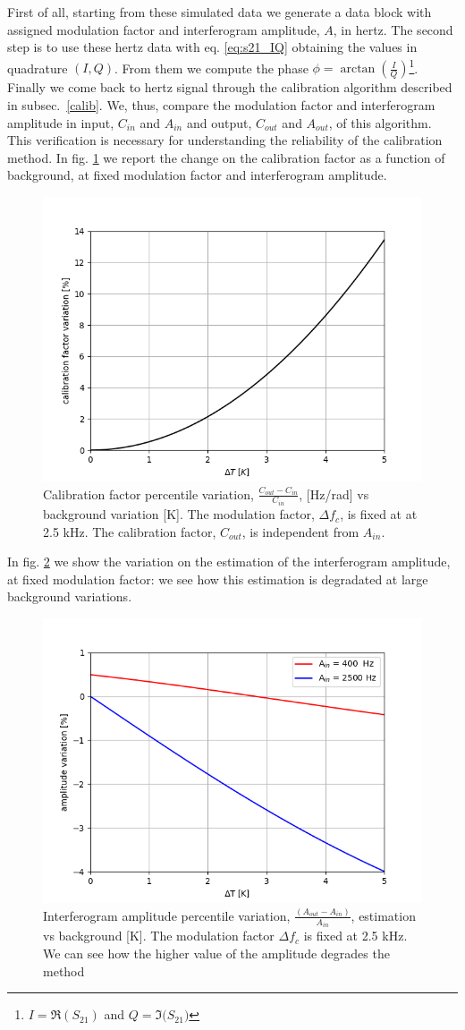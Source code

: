 \documentclass[twocolumn,traditabstract]{aa}\\
\begin{document}
First of all, starting from these simulated data we generate a data block with assigned modulation factor and interferogram amplitude, $A$, in hertz. The second step is to use these hertz data with eq. \ref{eq:s21_IQ} obtaining the values in quadrature $(I,Q)$. From them we compute the phase $\phi=\arctan\left(\frac{I}{Q}\right)$\footnote{ $I = \Re(S_{21})$ and $Q = \Im({S_{21})}$ }. Finally we come back to hertz signal through the calibration algorithm described in subsec.~\ref{calib}. We, thus, compare the modulation factor and interferogram amplitude in input, $C_{in}$ and $A_{in}$ and output, $C_{out}$ and $A_{out}$, of this algorithm. This verification is necessary for understanding the reliability of the calibration method. In fig. \ref{fig:cal_bck} we report the change on the calibration factor as a function of background, at fixed modulation factor and interferogram amplitude.

\begin{figure}[htf]
	\centering
	\includegraphics[width=.5\textwidth]{3.acqui/calibration_factor_variation.png}
	\caption{Calibration factor percentile variation, $\frac{C_{out}-C_{in}}{C_{in}}$, [Hz/rad] vs background variation [K]. The modulation factor, $\Delta f_c$, is fixed at at 2.5 kHz. The calibration factor, $C_{out}$, is independent from $A_{in}$.}
	\label{fig:cal_bck}
\end{figure}

\noindent In fig. \ref{fig:amp_bck} we show the variation on the estimation of the interferogram amplitude, at fixed modulation factor: we see how this estimation is degradated at large background variations.

\begin{figure}[htf]
	\centering
	\includegraphics[width=.5\textwidth]{3.acqui/amplitude_variation.png}
	\caption{Interferogram amplitude percentile variation, $\frac{(A_{out}-A_{in})}{A_{in}}$, estimation vs background [K]. The modulation factor $\Delta f_c$ is fixed at 2.5 kHz. We can see how the higher value of the amplitude degrades the method}
	\label{fig:amp_bck}
\end{figure}
\end{document}
